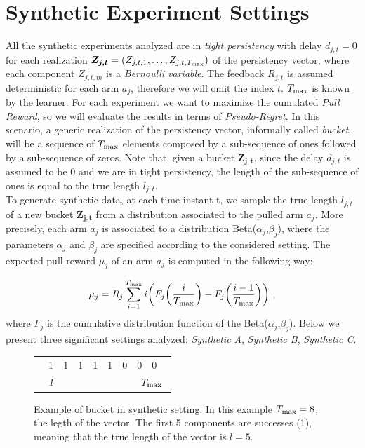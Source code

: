 \section{Synthetic Experiment Settings}
All the synthetic experiments analyzed are in \emph{tight persistency} with delay $d_{j,t}=0$ for each realization $\boldsymbol{Z_{j,t}} = (Z_{j,t,1},\dots,Z_{j,t,T_{\textnormal{max}}})$ of the persistency vector, where each component $Z_{j,t,m}$ is a \emph{Bernoulli variable}. The feedback $R_{j, t}$ is assumed deterministic for each arm $a_j$, therefore we will omit the index $t$. $T_{\textnormal{max}}$ is known by the learner. For each experiment we want to maximize the cumulated \emph{Pull Reward}, so we will evaluate the results in terms of \emph{Pseudo-Regret}. In this scenario, a generic realization of the persistency vector, informally called \emph{bucket}, will be a sequence of $T_{\textnormal{max}}$ elements composed by a sub-sequence of ones followed by a sub-sequence of zeros. Note that, given a bucket $\boldsymbol{Z_{j,t}}$, since the delay $d_{j,t}$ is assumed to be 0 and we are in tight persistency, the length of the sub-sequence of ones is equal to the true length $l_{j,t}$.\\
To generate synthetic data, at each time instant t, we sample the true length $l_{j,t}$ of a new bucket $\boldsymbol{Z_{j,t}}$ from a distribution associated to the pulled arm $a_j$. More precisely, each arm $a_j$ is associated to a distribution Beta($\alpha_j$,$\beta_j$), where the parameters $\alpha_j$ and $\beta_j$ are specified according to the considered setting. The expected pull reward $\mu_j$ of an arm $a_j$ is computed in the following way:

$$\mu_j = R_j\sum_{i=1}^{T_{\textnormal{max}}}i\bigg(F_j\bigg(\frac{i}{T_{\textnormal{max}}}\bigg)-F_j\bigg(\frac{i-1}{T_{\textnormal{max}}}\bigg)\bigg) \ ,$$
where $F_j$ is the cumulative distribution function of the Beta($\alpha_j$,$\beta_j$).
Below we present three significant settings analyzed: \emph{Synthetic A}, \emph{Synthetic B}, \emph{Synthetic C}.

\begin{figure}[t]
	\centering
	\begin{tabular}{llllllllll}
		\cline{2-9}
		\multicolumn{1}{l|}{} & \multicolumn{1}{l|}{1} & \multicolumn{1}{l|}{1} & \multicolumn{1}{l|}{1} & \multicolumn{1}{l|}{1} & \multicolumn{1}{l|}{1} & \multicolumn{1}{l|}{0} & \multicolumn{1}{l|}{0} & \multicolumn{1}{l|}{0} &  \\ \cline{2-9}
		& \textit{1}             & \textit{}              &                        &                        &                        &                        & \multicolumn{3}{c}{\textit{ $T_{\textnormal{max}}$}}                 
	\end{tabular}
	\caption{Example of bucket in synthetic setting. In this example $T_{\textnormal{max}}=8$, the legth of the vector. The first 5 components are successes (1), meaning that the true length of the vector is $l=5$.}
\end{figure}
